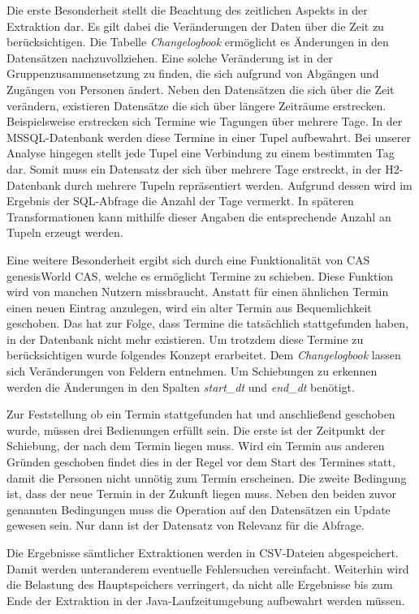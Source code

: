 Die erste Besonderheit stellt die Beachtung des zeitlichen Aspekts in der Extraktion dar. Es gilt dabei die Veränderungen der Daten über die Zeit zu berücksichtigen. Die Tabelle  \textit{Changelogbook} ermöglicht es Änderungen in den Datensätzen nachzuvollziehen. Eine solche Veränderung ist in der Gruppenzusammensetzung zu finden, die sich aufgrund von Abgängen und Zugängen von Personen ändert. Neben den Datensätzen die sich über die Zeit verändern, existieren Datensätze die sich über längere Zeiträume erstrecken. Beispielsweise erstrecken sich Termine wie Tagungen  über mehrere Tage. In der MSSQL-Datenbank werden diese Termine in einer Tupel aufbewahrt. Bei unserer Analyse hingegen stellt jede Tupel eine Verbindung zu einem bestimmten Tag dar. Somit muss ein Datensatz der sich über mehrere Tage erstreckt, in der H2-Datenbank durch mehrere Tupeln repräsentiert werden. Aufgrund dessen wird im Ergebnis der SQL-Abfrage die Anzahl der Tage vermerkt. In späteren Transformationen kann mithilfe dieser Angaben die entsprechende Anzahl an Tupeln erzeugt werden.

Eine weitere Besonderheit ergibt sich durch eine Funktionalität von CAS genesisWorld CAS, welche es ermöglicht Termine zu schieben. Diese Funktion wird von manchen Nutzern missbraucht. Anstatt für einen ähnlichen Termin einen neuen Eintrag anzulegen, wird ein alter Termin aus Bequemlichkeit geschoben. Das hat zur Folge, dass Termine die tatsächlich stattgefunden haben, in der Datenbank nicht mehr existieren. Um trotzdem diese Termine zu berücksichtigen wurde folgendes Konzept erarbeitet. Dem \textit{Changelogbook} lassen sich Veränderungen von Feldern entnehmen. Um Schiebungen zu erkennen werden die Änderungen in den Spalten \textit{start\_dt} und \textit{end\_dt} benötigt. 

Zur Feststellung ob ein Termin stattgefunden hat und anschließend geschoben wurde, müssen drei Bedienungen erfüllt sein. Die erste ist der Zeitpunkt der Schiebung, der nach dem Termin liegen muss. Wird ein Termin aus anderen Gründen geschoben findet dies in der Regel vor dem Start des Termines statt, damit die Personen nicht unnötig zum Termin erscheinen. Die zweite Bedingung ist, dass der neue Termin in der Zukunft liegen muss. Neben den beiden zuvor genannten Bedingungen muss die Operation auf den Datensätzen ein Update gewesen sein. Nur dann ist der Datensatz von Relevanz für die Abfrage. 

Die Ergebnisse sämtlicher Extraktionen werden in CSV-Dateien abgespeichert. Damit werden unteranderem eventuelle Fehlersuchen vereinfacht. Weiterhin wird die Belastung des Hauptspeichers verringert, da nicht alle Ergebnisse bis zum Ende der Extraktion in der Java-Laufzeitumgebung aufbewahrt werden müssen.

